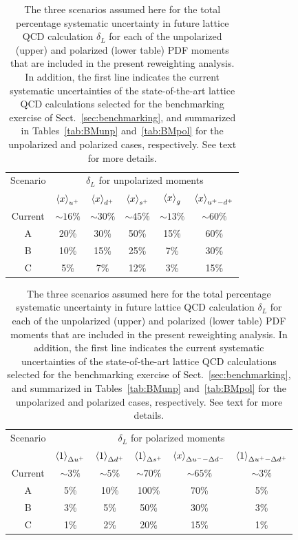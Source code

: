 \begin{table}[t]
  \centering
  \renewcommand{\arraystretch}{1.3} 
  \begin{tabular}{c||ccccc}
    \hline
    Scenario &  \multicolumn{5}{c}{$\delta_L$ for unpolarized moments}   \\
&    $\left\langle x\right\rangle_{u^+}$  &   $\left\langle x\right\rangle_{d^+}$   &  $\left\langle x\right\rangle_{s^+}$  &
$\left\langle x\right\rangle_{g}$  &   $\left\langle x\right\rangle_{u^+-d^+}$  \\
    \hline
    Current  & $\sim 16\%$  &  $\sim 30\%$
    & $\sim 45\%$  & $\sim 13\%$  &  $\sim 60\%$ \\
    A   & 20\%  & 30\% &  50\% &  15\% &  60\% \\
 B   & 10\%  & 15\% &  25\% &  7\% &  30\%  \\
  C   & 5\%  & 7\% &  12\% &  3\% &  15\%  \\
    \hline
  \end{tabular}\vspace{0.7cm}
   \begin{tabular}{c||ccccc}
    \hline
    Scenario   &
    \multicolumn{5}{c}{$\delta_L$ for polarized moments} \\ 
& $\left\langle 1\right\rangle_{\Delta u^+}$  & $\left\langle 1\right\rangle_{\Delta d^+}$  & $\left\langle 1\right\rangle_{\Delta s^+}$
&  $\left\langle x\right\rangle_{\Delta u^--\Delta d^-}$  &  $\left\langle 1\right\rangle_{\Delta u^+ - \Delta d^+}$\\
    \hline
    Current  &
    $\sim 3\%$  & $\sim 5\%$ & $\sim 70\%$ & $\sim 65\%$ & $\sim 3\%$ \\
    \hline
    A   & 
    5\% &    10\%  &   100\% &    70\%  &    5\% \\
 B   &
 3\% &    5\%  &   50\% &    30\%  &    3\% \\
  C   & 1\% &    2\%  &   20\% &    15\%  &    1\% \\
    \hline
  \end{tabular}
   \caption{\small The three scenarios assumed here
     for the total percentage
     systematic uncertainty
    in future lattice QCD calculation $\delta_L$ for each
    of the unpolarized (upper) and polarized (lower table) PDF
    moments that are included
    in the present reweighting analysis.
    In addition, the first line indicates the current systematic
    uncertainties of the state-of-the-art lattice QCD calculations
    selected for the benchmarking exercise of Sect.~\ref{sec:benchmarking},
    and summarized in Tables~\ref{tab:BMunp} and~\ref{tab:BMpol}
    for the unpolarized and polarized cases, respectively.
    See text for more details.
\label{tab:scenarios}
  }
\end{table}

